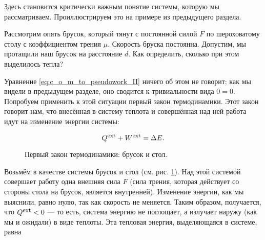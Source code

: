 \documentclass[a4paper,12pt]{article}
\newcommand{\foot}[1]{\mbox{\footnotesize{#1}}}
\newlength{\h}
\newlength{\x}
\begin{document}
Здесь становится критически важным понятие системы, которую мы
рассматриваем. Проиллюстрируем это на примере из предыдущего раздела.

Рассмотрим опять брусок, который тянут с постоянной силой $F$ по
шероховатому столу с коэффициентом трения $\mu$. Скорость бруска
постоянна. Допустим, мы протащили наш брусок на расстояние $d$. Как
определить, сколько при этом выделилось тепла? 

Уравнение \eqref{eq:c_o_m_to_pseudowork_II} ничего об этом не говорит;
как мы видели в предыдущем разделе, оно сводится к тривиальности вида
$0=0$. Попробуем применить к этой ситуации первый закон
термодинамики. Этот закон говорит нам, что внесённая в систему теплота
и совершённая над ней работа идут на изменение энергии системы:

\begin{equation}
  \label{eq:flt}
  Q^{\foot{ext}} + W^{\foot{ext}} = \Delta E. 
\end{equation}

\begin{figure}[h]
  \centering
  \caption{Первый закон термодинамики: брусок и стол.}
  \label{fig:flt_block_and_table}
\end{figure}

Возьмём в качестве системы брусок и стол
(см. рис. \ref{fig:flt_block_and_table}). Над этой системой совершает
работу одна внешняя сила $F$ (сила трения, которая действует со
стороны стола на брусок, является внутренней). Изменение энергии, как
мы выяснили, равно нулю, так как скорость не меняется. Таким образом,
получается, что $Q^{\foot{ext}}<0$ --- то есть, система энергию не
поглощает, а излучает наружу (как мы и ожидали) в виде теплоты. Эта
тепловая энергия, выделяющаяся в системе, равна
\end{document}
